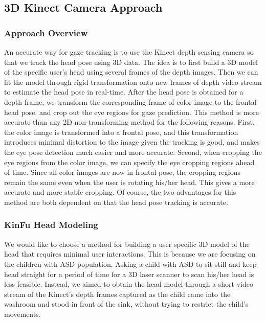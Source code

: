 
\subsection{3D Kinect Camera Approach}

\subsubsection{Approach Overview}
\label{sec:approachOverview}
An accurate way for gaze tracking is to use the Kinect depth sensing camera so that we track the head pose using 3D data.  The idea is to first build a 3D model of the specific user's head using several frames of the depth images.  Then we can fit the model through rigid transformation onto new frames of depth video stream to estimate the head pose in real-time.  After the head pose is obtained for a depth frame, we transform the corresponding frame of color image to the frontal head pose, and crop out the eye regions for gaze prediction.  This method is more accurate than any 2D non-transforming method for the following reasons.  First, the color image is transformed into a frontal pose, and this transformation introduces minimal distortion to the image given the tracking is good, and makes the eye pose detection much easier and more accurate.  Second, when cropping the eye regions from the color image, we can specify the eye cropping regions ahead of time.  Since all color images are now in frontal pose, the cropping regions remain the same even when the user is rotating his/her head.  This gives a more accurate and more stable cropping.  Of course, the two advantages for this method are both dependent on that the head pose tracking is accurate.

\subsubsection{KinFu Head Modeling}
We would like to choose a method for building a user specific 3D model of the head that requires minimal user interactions.  This is because we are focusing on the children with ASD population.  Asking a child with ASD to sit still and keep head straight for a period of time for a 3D laser scanner to scan his/her head is less feasible.  Instead, we aimed to obtain the head model through a short video stream of the Kinect's depth frames captured as the child came into the washroom and stood in front of the sink, without trying to restrict the child's movements.

